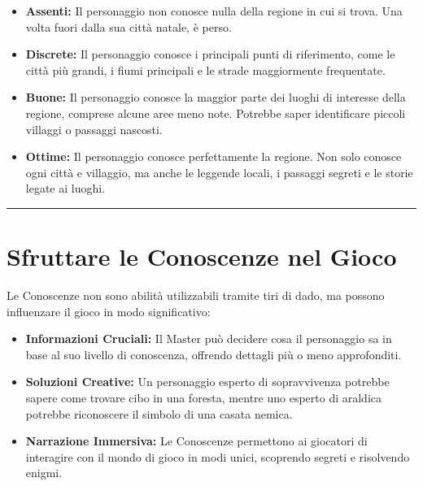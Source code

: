 \documentclass[../manuale_main.tex]{subfiles}
\begin{document}
\begin{itemize}
    \item \textbf{Assenti:} Il personaggio non conosce nulla della regione in cui si trova. Una volta fuori dalla sua città natale, è perso.
    
    \item \textbf{Discrete:} Il personaggio conosce i principali punti di riferimento, come le città più grandi, i fiumi principali e le strade maggiormente frequentate.
    
    \item \textbf{Buone:} Il personaggio conosce la maggior parte dei luoghi di interesse della regione, comprese alcune aree meno note. Potrebbe saper identificare piccoli villaggi o passaggi nascosti.
    
    \item \textbf{Ottime:} Il personaggio conosce perfettamente la regione. Non solo conosce ogni città e villaggio, ma anche le leggende locali, i passaggi segreti e le storie legate ai luoghi.
\end{itemize}

\vspace{0.5cm}
\noindent
\begin{center}
\rule{\textwidth}{0.4pt} 
\end{center}
\vspace{0.5cm}

\section{Sfruttare le Conoscenze nel Gioco}
Le Conoscenze non sono abilità utilizzabili tramite tiri di dado, ma possono influenzare il gioco in modo significativo:

\begin{itemize}
    \item \textbf{Informazioni Cruciali:} Il Master può decidere cosa il personaggio sa in base al suo livello di conoscenza, offrendo dettagli più o meno approfonditi.
    
    \item \textbf{Soluzioni Creative:} Un personaggio esperto di sopravvivenza potrebbe sapere come trovare cibo in una foresta, mentre uno esperto di araldica potrebbe riconoscere il simbolo di una casata nemica.
    
    \item \textbf{Narrazione Immersiva:} Le Conoscenze permettono ai giocatori di interagire con il mondo di gioco in modi unici, scoprendo segreti e risolvendo enigmi.
\end{itemize}
\end{document}
